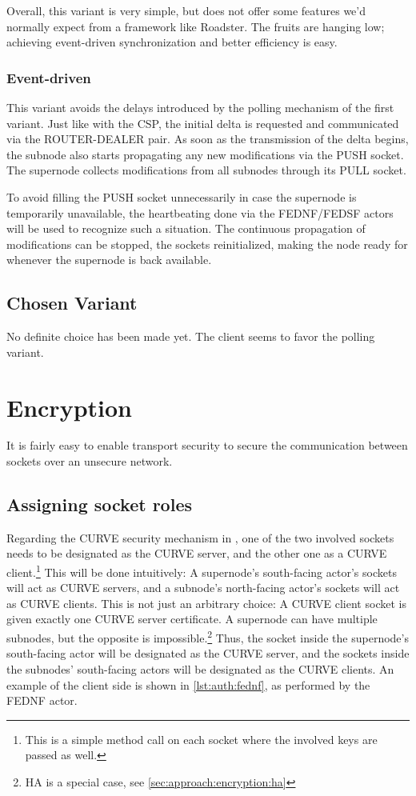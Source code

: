 Overall, this variant is very simple, but does not offer some features we'd
normally expect from a framework like Roadster. The fruits are hanging low;
achieving event-driven synchronization and better efficiency is easy.

\subsubsection{Event-driven}
This variant avoids the delays introduced by the polling mechanism of the first
variant. Just like with the \gls{CSP}, the initial delta is requested and
communicated via the ROUTER-DEALER pair. As soon as the transmission of the
delta begins, the subnode also starts propagating any new modifications via the
PUSH socket. The supernode collects modifications from all subnodes through its
PULL socket.

To avoid filling the PUSH socket unnecessarily in case the supernode is
temporarily unavailable, the heartbeating done via the FEDNF/FEDSF actors will
be used to recognize such a situation. The continuous propagation of
modifications can be stopped, the sockets reinitialized, making the node ready
for whenever the supernode is back available.

\subsection{Chosen Variant}
No definite choice has been made yet. The client seems to favor the polling variant.

\section{Encryption}\label{sec:approach:encryption}
It is fairly easy to enable transport security to secure the communication
between \zmq sockets over an unsecure network.

\subsection{Assigning socket roles}
Regarding the CURVE security mechanism in \zmq, one of the two involved sockets
needs to be designated as the CURVE server, and the other one as a CURVE
client.\footnote{This is a simple method call on each socket where the involved
keys are passed as well.} This will be done intuitively: A supernode's
south-facing actor's sockets will act as CURVE servers, and a subnode's
north-facing actor's sockets will act as CURVE clients. This is not just an
arbitrary choice: A CURVE client socket is given exactly one CURVE server
certificate. A supernode can have multiple subnodes, but the opposite is
impossible.\footnote{HA is a special case, see
\autoref{sec:approach:encryption:ha}} Thus, the socket inside the supernode's
south-facing actor will be designated as the CURVE server, and the sockets
inside the subnodes' south-facing actors will be designated as the CURVE
clients. An example of the client side is shown in \autoref{lst:auth:fednf}, as
performed by the FEDNF actor.


